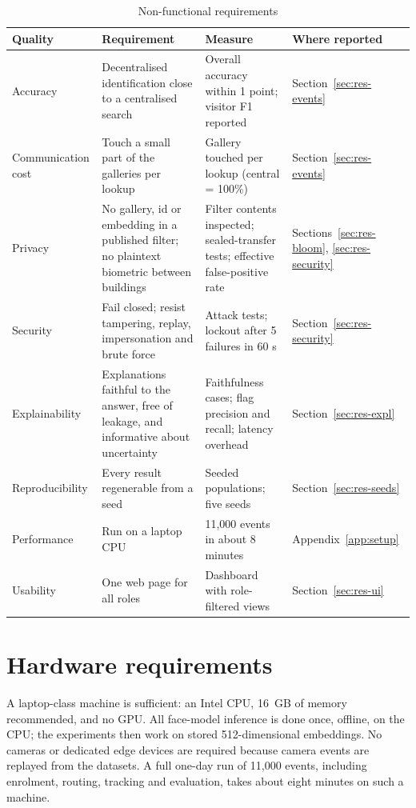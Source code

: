 \documentclass[12pt,a4paper,oneside]{report}
\begin{document}
\begin{table}[htbp]
\centering
\caption{Non-functional requirements}\label{tab:nfr}
{\small\setlength{\tabcolsep}{4pt}\renewcommand{\arraystretch}{1.2}
\begin{tabular}{|p{2.45cm}|p{5.29cm}|p{3.40cm}|p{2.83cm}|}\hline
\textbf{Quality} & \textbf{Requirement} & \textbf{Measure} & \textbf{Where reported}\\\hline
Accuracy & Decentralised identification close to a centralised search & Overall accuracy within 1 point; visitor F1 reported & Section~\ref{sec:res-events}\\\hline
Communication cost & Touch a small part of the galleries per lookup & Gallery touched per lookup (central = 100\%) & Section~\ref{sec:res-events}\\\hline
Privacy & No gallery, id or embedding in a published filter; no plaintext biometric between buildings & Filter contents inspected; sealed-transfer tests; effective false-positive rate & Sections~\ref{sec:res-bloom}, \ref{sec:res-security}\\\hline
Security & Fail closed; resist tampering, replay, impersonation and brute force & Attack tests; lockout after 5 failures in 60 s & Section~\ref{sec:res-security}\\\hline
Explainability & Explanations faithful to the answer, free of leakage, and informative about uncertainty & Faithfulness cases; flag precision and recall; latency overhead & Section~\ref{sec:res-expl}\\\hline
Reproducibility & Every result regenerable from a seed & Seeded populations; five seeds & Section~\ref{sec:res-seeds}\\\hline
Performance & Run on a laptop CPU & 11,000 events in about 8 minutes & Appendix~\ref{app:setup}\\\hline
Usability & One web page for all roles & Dashboard with role-filtered views & Section~\ref{sec:res-ui}\\\hline
\end{tabular}}
\end{table}

\section{Hardware requirements}
A laptop-class machine is sufficient: an Intel CPU, 16~GB of memory recommended, and no GPU. All face-model inference is done once, offline, on the CPU; the experiments then work on stored 512-dimensional embeddings. No cameras or dedicated edge devices are required because camera events are replayed from the datasets. A full one-day run of 11,000 events, including enrolment, routing, tracking and evaluation, takes about eight minutes on such a machine.
\end{document}
